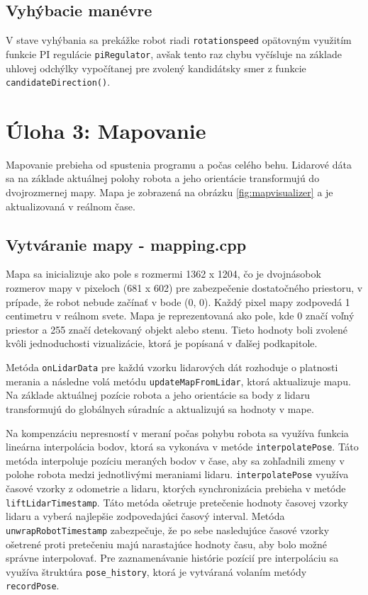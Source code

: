 \subsection{Vyhýbacie manévre}
V stave vyhýbania sa prekážke robot riadi \texttt{rotationspeed} opätovným využitím funkcie PI regulácie \texttt{piRegulator}, avšak tento raz chybu vyčísluje na základe uhlovej odchýlky vypočítanej pre zvolený kandidátsky smer z funkcie \texttt{candidateDirection()}.




\section{Úloha 3: Mapovanie}
Mapovanie prebieha od spustenia programu a počas celého behu. Lidarové dáta sa na základe aktuálnej polohy robota a jeho orientácie transformujú do dvojrozmernej mapy. Mapa je zobrazená na obrázku \ref{fig:mapvisualizer} a je aktualizovaná v reálnom čase.

\subsection{Vytváranie mapy - mapping.cpp}
Mapa sa inicializuje ako pole s rozmermi 1362 x 1204, čo je dvojnásobok rozmerov mapy v pixeloch (681 x 602) pre zabezpečenie dostatočného priestoru, v prípade, že robot nebude začínať v bode (0, 0). Každý pixel mapy zodpovedá 1 centimetru v reálnom svete. Mapa je reprezentovaná ako pole, kde 0 značí voľný priestor a 255 značí detekovaný objekt alebo stenu. Tieto hodnoty boli zvolené kvôli jednoduchosti vizualizácie, ktorá je popísaná v ďalšej podkapitole.

Metóda \texttt{onLidarData} pre každú vzorku lidarových dát rozhoduje o platnosti merania a následne volá metódu \texttt{updateMapFromLidar}, ktorá aktualizuje mapu. Na základe aktuálnej pozície robota a jeho orientácie sa body z lidaru transformujú do globálnych súradníc a aktualizujú sa hodnoty v mape. 

Na kompenzáciu nepresností v meraní počas pohybu robota sa využíva funkcia lineárna interpolácia bodov, ktorá sa vykonáva v metóde \texttt{interpolatePose}. Táto metóda interpoluje pozíciu meraných bodov v čase, aby sa zohľadnili zmeny v polohe robota medzi jednotlivými meraniami lidaru. \texttt{interpolatePose} využíva časové vzorky z odometrie a lidaru, ktorých synchronizácia prebieha v metóde \texttt{liftLidarTimestamp}. Táto metóda ošetruje pretečenie hodnoty časovej vzorky lidaru a vyberá najlepšie zodpovedajúci časový interval. Metóda \texttt{unwrapRobotTimestamp} zabezpečuje, že po sebe nasledujúce časové vzorky ošetrené proti pretečeniu majú narastajúce hodnoty času, aby bolo možné správne interpolovať. Pre zaznamenávanie histórie pozícií pre interpoláciu sa využíva štruktúra \texttt{pose\_history}, ktorá je vytváraná volaním metódy \texttt{recordPose}. 

